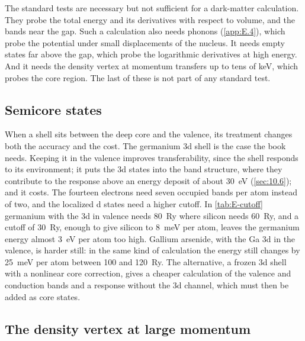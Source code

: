 The standard tests are necessary but not sufficient for a dark-matter calculation. They probe the total energy and its derivatives with respect to volume, and the bands near the gap. Such a calculation also needs phonons (\cref{app:E.4}), which probe the potential under small displacements of the nucleus. It needs empty states far above the gap, which probe the logarithmic derivatives at high energy. And it needs the density vertex at momentum transfers up to tens of keV, which probes the core region. The last of these is not part of any standard test.

\subsection{Semicore states}

When a shell sits between the deep core and the valence, its treatment changes both the accuracy and the cost. The germanium 3d shell is the case the book needs. Keeping it in the valence improves transferability, since the shell responds to its environment; it puts the 3d states into the band structure, where they contribute to the response above an energy deposit of about \SI{30}{eV} (\cref{sec:10.6}); and it costs. The fourteen electrons need seven occupied bands per atom instead of two, and the localized d states need a higher cutoff. In \cref{tab:E-cutoff} germanium with the 3d in valence needs \SI{80}{Ry} where silicon needs \SI{60}{Ry}, and a cutoff of \SI{30}{Ry}, enough to give silicon to \SI{8}{meV} per atom, leaves the germanium energy almost \SI{3}{eV} per atom too high. Gallium arsenide, with the Ga 3d in the valence, is harder still: in the same kind of calculation the energy still changes by \SI{25}{meV} per atom between 100 and \SI{120}{Ry}. The alternative, a frozen 3d shell with a nonlinear core correction, gives a cheaper calculation of the valence and conduction bands and a response without the 3d channel, which must then be added as core states.

\subsection{The density vertex at large momentum}

